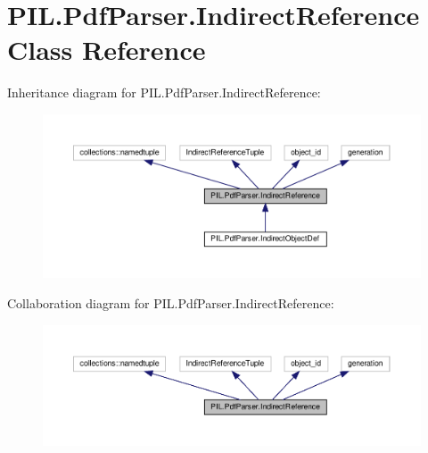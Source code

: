 \hypertarget{classPIL_1_1PdfParser_1_1IndirectReference}{}\section{P\+I\+L.\+Pdf\+Parser.\+Indirect\+Reference Class Reference}
\label{classPIL_1_1PdfParser_1_1IndirectReference}


Inheritance diagram for P\+I\+L.\+Pdf\+Parser.\+Indirect\+Reference\+:
\nopagebreak
\begin{figure}[H]
\begin{center}
\leavevmode
\includegraphics[width=350pt]{classPIL_1_1PdfParser_1_1IndirectReference__inherit__graph}
\end{center}
\end{figure}


Collaboration diagram for P\+I\+L.\+Pdf\+Parser.\+Indirect\+Reference\+:
\nopagebreak
\begin{figure}[H]
\begin{center}
\leavevmode
\includegraphics[width=350pt]{classPIL_1_1PdfParser_1_1IndirectReference__coll__graph}
\end{center}
\end{figure}
